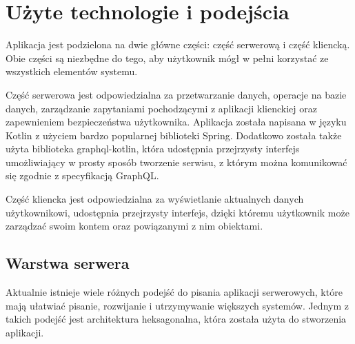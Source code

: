 \newpage
\section{Użyte technologie i podejścia}
Aplikacja jest podzielona na dwie główne części: część serwerową i część kliencką. Obie części są niezbędne do tego, aby użytkownik mógł w pełni korzystać ze wszystkich elementów systemu.

Część serwerowa jest odpowiedzialna za przetwarzanie danych, operacje na bazie danych, zarządzanie zapytaniami pochodzącymi z aplikacji klienckiej oraz zapewnieniem bezpieczeństwa użytkownika. Aplikacja została napisana w języku Kotlin z użyciem bardzo popularnej biblioteki Spring. Dodatkowo została także użyta biblioteka graphql-kotlin, która udostępnia przejrzysty interfejs umożliwiający w prosty sposób tworzenie serwisu, z którym można komunikować się zgodnie z specyfikacją GraphQL.


Część kliencka jest odpowiedzialna za wyświetlanie aktualnych danych użytkownikowi, udostępnia przejrzysty interfejs, dzięki któremu użytkownik może zarządzać swoim kontem oraz powiązanymi z nim obiektami.


\subsection{Warstwa serwera}
Aktualnie istnieje wiele różnych podejść do pisania aplikacji serwerowych, które mają ułatwiać pisanie, rozwijanie i utrzymywanie większych systemów. Jednym z takich podejść jest architektura heksagonalna, która została użyta do stworzenia aplikacji.
